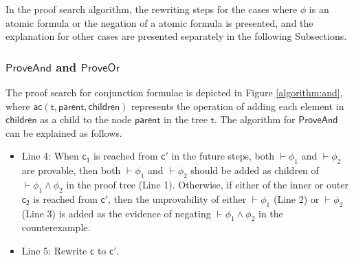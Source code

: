 In the proof search algorithm, the rewriting steps for the cases where $\phi$ is an atomic formula or the negation of a atomic formula is presented, and the explanation for other cases are presented separately in the following Subsections.
\subsubsection{$\mathsf{ProveAnd}$ and $\mathsf{ProveOr}$}
The proof search for conjunction formulae is depicted in Figure \ref{algorithm:and}, where $\mathsf{ac (t, parent, children)}$ represents the operation of adding each element in $\mathsf{children}$ as a child to the node $\mathsf{parent}$ in the tree $\mathsf{t}$. The algorithm for $\mathsf{ProveAnd}$ can be explained as follows.

\begin{itemize}
	\item Line 4: When $\mathsf{c_1}$ is reached from $\mathsf{c'}$ in the future steps, both $\vdash\phi_1$ and $\vdash\phi_2$ are provable, then both $\vdash\phi_1$ and $\vdash\phi_2$ should be added as children of $\vdash\phi_1\wedge\phi_2$ in the proof tree (Line 1). Otherwise, if either of the inner or outer $\mathsf{c_2}$ is reached from $\mathsf{c'}$, then the unprovability of either $\vdash\phi_1$ (Line 2) or $\vdash\phi_2$ (Line 3) is added as the evidence of negating $\vdash\phi_1\wedge\phi_2$ in the counterexample.
	\item Line 5: Rewrite $\mathsf{c}$ to $\mathsf{c'}$.
\end{itemize}

